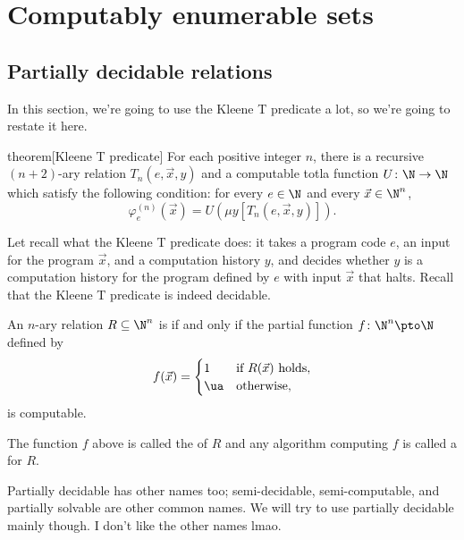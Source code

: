 \documentclass[class=article, crop=false]{standalone}
\begin{document}
\section{Computably enumerable sets}

\subsection{Partially decidable relations}

In this section, we're going to use the Kleene T predicate a lot, so we're going to restate it here.

\begin{result}{theorem}[Kleene T predicate]
  For each positive integer $n$, there is a recursive $(n+2)$-ary relation $T_n(e, \vec x,y)$ and a computable totla function $U\colon \N \to \N$ which satisfy the following condition: for every $e \in \N$ and every $\vec x \in \N^n$,
    \[
      \varphi_e^{(n)} (\vec x) = U(\mu y[T_n(e, \vec x, y)]).
    \]
\end{result}
\begin{rem}
  Let recall what the Kleene T predicate does: it takes a program code $e$, an input for the program $\vec x$, and a computation history $y$, and decides whether $y$ is a computation history for the program defined by $e$ with input $\vec x$ that halts. Recall that the Kleene T predicate is indeed decidable.
\end{rem}

\begin{defn}
  An $n$-ary relation $R \subseteq \N^n$ is  if and only if the partial function $f\colon \N^n \pto \N$ defined by
    \[
      f(\vec x) =
        \begin{cases}
          1 &\text{if } R(\vec x) \text{ holds}, \\
          \ua &\text{otherwise},
        \end{cases}
    \]
  is computable.

  The function $f$ above is called the  of $R$ and any algorithm computing $f$ is called a  for $R$.
\end{defn}
\begin{rem}
  Partially decidable has other names too; semi-decidable, semi-computable, and partially solvable are other common names. We will try to use partially decidable mainly though. I don't like the other names lmao.
\end{rem}
\end{document}
